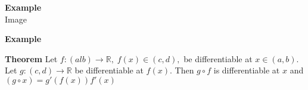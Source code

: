 \documentclass[12pt]{article}
\begin{document}
\vspace{1\baselineskip}
\begin{block}{\bf Example}\\ 
Image
\end{block}

\vspace{1\baselineskip}
\begin{block}{\bf Example}\\ 

\end{block}

\vspace{1\baselineskip}
\begin{block}{\bf Theorem}
Let $f\colon(alb)\rightarrow\mathbb{R},\; f(x)\in(c,d),$ be differentiable at $x\in(a,b)$. Let $g\colon (c,d)\rightarrow\mathbb{R}$ be differentiable at $f(x).$ Then $g\circ f$ is differentiable at $x$ and $(g\circ x)=g'(f(x))f'(x)$ 
\end{block}
\end{document}
